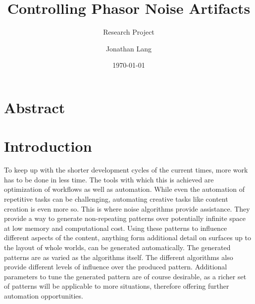 \documentclass{utue} %
\title{Controlling Phasor Noise Artifacts}
\author{Jonathan Lang}
\date{\today}
\subtitle{Research Project}
\begin{document}

\maketitle 
 
\section*{Abstract}  
  
\section{Introduction}   
To keep up with the shorter development cycles of the current times, more work has to be done in less time. The tools with which this is achieved are optimization of workflows as well as automation. While even the automation of repetitive tasks can be challenging, automating creative tasks like content creation is even more so. This is where noise algorithms provide assistance. They provide a way to generate non-repeating patterns over potentially infinite space at low memory and computational cost. Using these patterns to influence different aspects of the content, anything form additional detail on surfaces up to the layout of whole worlds, can be generated automatically. The generated patterns are as varied as the algorithms itself. The different algorithms also provide different levels of influence over the produced pattern. Additional parameters to tune the generated pattern are of course desirable, as a richer set of patterns will be applicable to more situations, therefore offering further automation opportunities.
\end{document}
